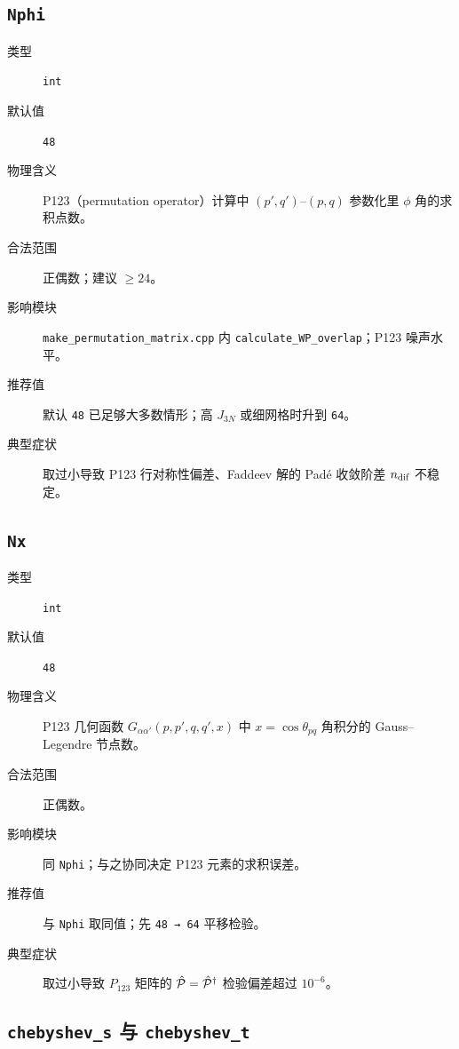 \subsection{\texttt{Nphi}}

\begin{description}
  \item[类型] \texttt{int}
  \item[默认值] \texttt{48}
  \item[物理含义] P123（permutation operator）计算中 \((p',q')\)–\((p,q)\) 参数化里 \(\phi\) 角的求积点数。
  \item[合法范围] 正偶数；建议 \(\ge 24\)。
  \item[影响模块] \texttt{make\_permutation\_matrix.cpp} 内 \texttt{calculate\_WP\_overlap}；P123 噪声水平。
  \item[推荐值] 默认 \texttt{48} 已足够大多数情形；高 \(J_{3N}\) 或细网格时升到 \texttt{64}。
  \item[典型症状] 取过小导致 P123 行对称性偏差、Faddeev 解的 Padé 收敛阶差 \(n_{\text{dif}}\) 不稳定。
\end{description}

\subsection{\texttt{Nx}}

\begin{description}
  \item[类型] \texttt{int}
  \item[默认值] \texttt{48}
  \item[物理含义] P123 几何函数 \(G_{\alpha\alpha'}(p,p',q,q',x)\) 中 \(x=\cos\theta_{pq}\) 角积分的 Gauss–Legendre 节点数。
  \item[合法范围] 正偶数。
  \item[影响模块] 同 \texttt{Nphi}；与之协同决定 P123 元素的求积误差。
  \item[推荐值] 与 \texttt{Nphi} 取同值；先 \texttt{48 → 64} 平移检验。
  \item[典型症状] 取过小导致 \(P_{123}\) 矩阵的 \(\hat{\mathcal{P}}=\hat{\mathcal{P}}^\dagger\) 检验偏差超过 \(10^{-6}\)。
\end{description}

\subsection{\texttt{chebyshev\_s} 与 \texttt{chebyshev\_t}}

